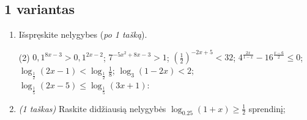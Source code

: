 \documentclass[a4paper]{article}
\begin{document}
\vspace*{6mm}

\subsection*{1 variantas}

\begin{enumerate}
      \item Išspręskite nelygybes (\textit{po 1 tašką}).

            \begin{tasks}[item-format={\normalfont}, after-item-skip=2mm](2)
                  \task $0,1^{8x-3}>0,1^{2x-2}$;
                  \task $7^{-5x^2+8x-3}>1$;
                  \task $(\frac{1}{2})^{-2x+5}<32$;
                  \task $4^{\frac{2x}{1-x}}-16^{\frac{x-6}{2}} \leqslant 0$;
                  \task $\log_{\frac{1}{2}}(2x-1)<\log_{\frac{1}{2}}\frac{1}{8}$;
                  \task $\log_{3}(1-2x)<2$;
                  \task $\log_{\frac{1}{5}}(2x-5) \leqslant \log_{\frac{1}{5}}(3x+1)$:
            \end{tasks}

      \item \textit{(1 taškas)} Raskite didžiausią nelygybės $\log_{0.25}(1+x) \geqslant \frac{1}{2}$ sprendinį;

\end{enumerate}
\end{document}
